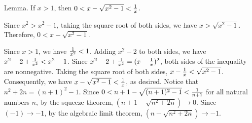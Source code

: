 \proclaim Lemma. If $x > 1$, then $0 < x - \sqrt {x^2 - 1} < {1 \over x}$.

Since $x^2 > x^2 - 1$, taking the square root of both sides,
we have $x > \sqrt {x^2 - 1}$.
Therefore, $0 < x - \sqrt {x^2 - 1}$.

Since $x > 1$, we have ${1 \over x^2} < 1$.
Adding $x^2 - 2$ to both sides, we have $x^2 - 2 + {1 \over x^2} < x^2 - 1$.
Since $x^2 - 2 + {1 \over x^2} = (x - {1 \over x})^2$,
both sides of the inequality are nonnegative.
Taking the square root of both sides, $x - {1 \over x} < \sqrt {x^2 - 1}$.
Consequently, we have $x - \sqrt {x^2 - 1} < {1 \over x}$, as desired.
\medskip
Notice that $n^2 + 2n = (n + 1)^2 - 1$.
Since $0 < n + 1 - \sqrt {(n + 1)^2 - 1} < {1 \over n + 1}$
for all natural numbers $n$,
by the squeeze theorem, $(n + 1 - \sqrt {n^2 + 2n}) \to 0$.
Since $(-1) \to -1$, by the algebraic limit theorem,
$(n - \sqrt {n^2 + 2n}) \to -1$.
\bye
